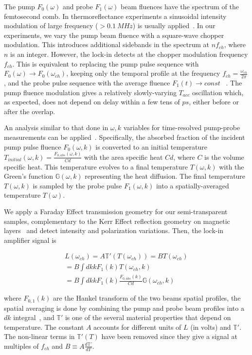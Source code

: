 \documentclass[5p]{elsarticle}
\begin{document}
The pump $F_{0}(\omega)$ and probe $F_{1}(\omega)$ beam fluences have the spectrum of the femtosecond comb. In thermoreflectance experiments a sinusoidal intensity modulation of large frequency ($> 0.1~MHz$) is usually applied~\cite{2004Cahill}. In our experiments, we vary the pump beam fluence with a square-wave chopper modulation. This introduces additional sidebands in the spectrum at $nf_{ch}$, where $n$ is an integer. However, the lock-in detects at the chopper modulation frequency $f_{ch}$. This is equivalent to replacing the pump pulse sequence with $F_{0}(\omega) \rightarrow F_{0}(\omega_{ch})$, keeping only the temporal profile at the frequency $f_{ch}=\frac{\omega_{ch}}{2 \pi}$, and the probe pulse sequence with the average fluence $F_{1}(t) \rightarrow const$ ~\cite{2009Schmidt}. The pump fluence modulation gives a  relatively slowly-varying $T_{acc}$ oscillation which, as expected, does not depend on delay within a few tens of $ps$, either before or after the overlap.

An analysis similar to that done in $\omega, k$ variables for time-resolved pump-probe measurements can be applied~\cite{2004Cahill}. Specifically, the absorbed fraction of the incident pump pulse fluence $F_{0}(\omega,k)$ is converted to an initial temperature $T_{initial}(\omega,k)=\frac{F_{0,abs}(\omega,k)}{Cd}$ with the area specific heat $Cd$, where $C$ is the volume specific heat. This temperature evolves to a final temperature $T(\omega,k)$ with the Green's function $\mathbb{G}(\omega,k)$ representing the heat diffusion. The final temperature $T(\omega,k)$ is sampled by the probe pulse $F_{1}(\omega,k)$ into  a spatially-averaged temperature $T(\omega)$.

We apply a Faraday Effect transmission geometry for our semi-transparent samples, complementary to the Kerr Effect reflection geometry on magnetic layers~\cite{2014Liu} and detect intensity and polarization variations. Then, the lock-in amplifier signal is

\begin{eqnarray}
L(\omega_{ch}) = A \mathbb{T'}(T(\omega_{ch})) =B T(\omega_{ch}) \\ \nonumber
=B \int dk k F_{1} (k) T(\omega_{ch},k)  \\ \nonumber
=B \int dk k F_{1}(k) \frac{F_{0,abs}(k)}{Cd} \mathbb{G}(\omega_{ch}, k)
\end{eqnarray}

\noindent where $F_{0,1}(k)$ are the Hankel transform of the two beams spatial profiles, the spatial averaging is done by combining the pump and probe beam profiles into a $dk$ integral~\cite{2004Cahill}, and $\mathbb{T'}$ is one of the several material properties that depend on temperature. The constant $A$ accounts for different units of $L$ (in volts) and $\mathbb{T'}$. The non-linear terms in $\mathbb{T'}(T)$ have been removed since they give a signal at multiples of $f_{ch}$ and $B\equiv A \frac{d\mathbb{T'}}{dT}$.
\end{document}
